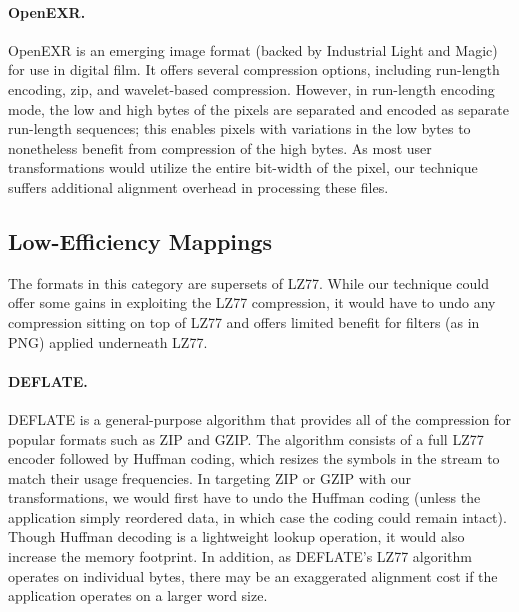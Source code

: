 \paragraph{OpenEXR.}
OpenEXR is an emerging image format (backed by Industrial Light and
Magic) for use in digital film.  It offers several compression
options, including run-length encoding, zip, and wavelet-based
compression.  However, in run-length encoding mode, the low and high
bytes of the pixels are separated and encoded as separate run-length
sequences; this enables pixels with variations in the low bytes to
nonetheless benefit from compression of the high bytes.  As most user
transformations would utilize the entire bit-width of the pixel, our
technique suffers additional alignment overhead in processing these
files.

\subsection{Low-Efficiency Mappings}
\label{sec:formats-bad}

The formats in this category are supersets of LZ77.  While our
technique could offer some gains in exploiting the LZ77 compression,
it would have to undo any compression sitting on top of LZ77 and
offers limited benefit for filters (as in PNG) applied underneath
LZ77.

\paragraph{DEFLATE.}
DEFLATE is a general-purpose algorithm that provides all of the
compression for popular formats such as ZIP and GZIP.  The algorithm
consists of a full LZ77 encoder followed by Huffman coding, which
resizes the symbols in the stream to match their usage frequencies.
In targeting ZIP or GZIP with our transformations, we would first
have to undo the Huffman coding (unless the application simply
reordered data, in which case the coding could remain intact).  Though
Huffman decoding is a lightweight lookup operation, it would also
increase the memory footprint.  In addition, as DEFLATE's LZ77
algorithm operates on individual bytes, there may be an exaggerated
alignment cost if the application operates on a larger word size.


